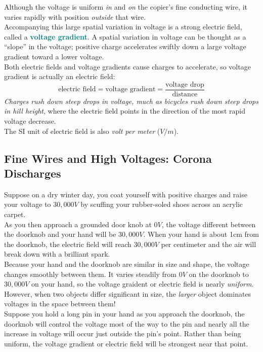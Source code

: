 \documentclass[12pt]{article}
\theoremstyle{definition}
\newcommand{\defnterm}[1]{\textbf{\textcolor{teal}{#1}}\index{#1}}
\begin{document}
Although the voltage is uniform \emph{in} and \emph{on} the copier's fine conducting wire, it varies rapidly with position \emph{outside} that wire. \\
Accompanying this large spatial variation in voltage is a strong electric field, called a \defnterm{voltage gradient}.
A spatial variation in voltage can be thought as a ``slope'' in the voltage;
positive charge accelerates swiftly down a large voltage gradient toward a lower voltage. \\

Both electric fields and voltage gradients cause charges to accelerate, so voltage gradient is actually an electric field:
$$\text{electric field} = \text{voltage gradient} = \frac{\text{voltage drop}}{\text{distance}}$$
\emph{Charges rush down steep drops in voltage, much as bicycles rush down steep drops in hill height}, where the electric field points in the direction of the most rapid voltage decrease. \\
The SI unit of electric field is also \emph{volt per meter} ($V/m$).

\subsection{Fine Wires and High Voltages: Corona Discharges}
Suppose on a dry winter day, you coat yourself with positive charges and raise your voltage to $30,000V$ by scuffing your rubber-soled shoes across an acrylic carpet. \\
As you then approach a grounded door knob at $0V$, the voltage different between the doorknob and your hand will be $30,000V$.
When your hand is about 1cm from the doorknob, the electric field will reach $30,000V$ per centimeter and the air will break down with a brilliant spark. \\
Because your hand and the doorknob are similar in size and shape, the voltage changes smoothly between them.
It varies steadily from $0V$ on the doorknob to $30,000V$ on your hand, so the voltage graident or electric field is nearly \emph{uniform}. \\

However, when two objects differ significant in size, the \emph{larger} object dominates voltages in the space between them! \\
Suppose you hold a long pin in your hand as you approach the doorknob, the doorknob will control the voltage most of the way to the pin and nearly all the increase in voltage will occur just outside the pin's point.
Rather than being uniform, the voltage gradient or electric field will be strongest near that point. \\
\end{document}
